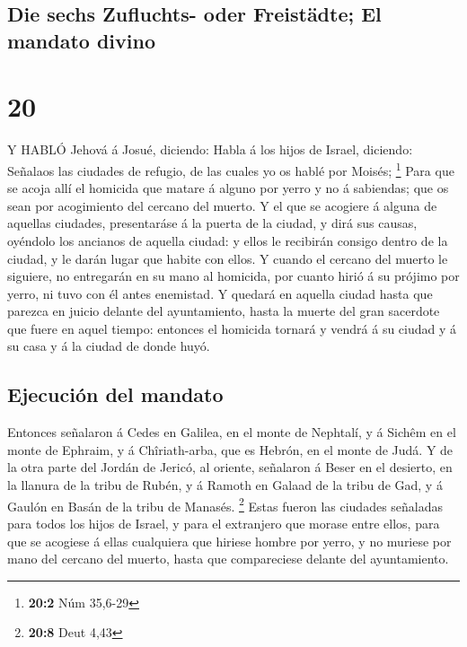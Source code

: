 \hypertarget{die-sechs-zufluchts--oder-freistuxe4dte-el-mandato-divino}{%
\subsection{Die sechs Zufluchts- oder Freistädte; El mandato
divino}\label{die-sechs-zufluchts--oder-freistuxe4dte-el-mandato-divino}}

\hypertarget{section-19}{%
\section{20}\label{section-19}}

 Y HABLÓ Jehová á Josué, diciendo:  Habla á los
hijos de Israel, diciendo: Señalaos las ciudades de refugio, de las
cuales yo os hablé por Moisés; \footnote{\textbf{20:2} Núm 35,6-29}
 Para que se acoja allí el homicida que matare á alguno por
yerro y no á sabiendas; que os sean por acogimiento del cercano del
muerto.  Y el que se acogiere á alguna de aquellas ciudades,
presentaráse á la puerta de la ciudad, y dirá sus causas, oyéndolo los
ancianos de aquella ciudad: y ellos le recibirán consigo dentro de la
ciudad, y le darán lugar que habite con ellos.  Y cuando el
cercano del muerto le siguiere, no entregarán en su mano al homicida,
por cuanto hirió á su prójimo por yerro, ni tuvo con él antes enemistad.
 Y quedará en aquella ciudad hasta que parezca en juicio
delante del ayuntamiento, hasta la muerte del gran sacerdote que fuere
en aquel tiempo: entonces el homicida tornará y vendrá á su ciudad y á
su casa y á la ciudad de donde huyó.

\hypertarget{ejecuciuxf3n-del-mandato}{%
\subsection{Ejecución del mandato}\label{ejecuciuxf3n-del-mandato}}

 Entonces señalaron á Cedes en Galilea, en el monte de
Nephtalí, y á Sichêm en el monte de Ephraim, y á Chîriath-arba, que es
Hebrón, en el monte de Judá.  Y de la otra parte del Jordán
de Jericó, al oriente, señalaron á Beser en el desierto, en la llanura
de la tribu de Rubén, y á Ramoth en Galaad de la tribu de Gad, y á
Gaulón en Basán de la tribu de Manasés. \footnote{\textbf{20:8} Deut
  4,43}  Estas fueron las ciudades señaladas para todos los
hijos de Israel, y para el extranjero que morase entre ellos, para que
se acogiese á ellas cualquiera que hiriese hombre por yerro, y no
muriese por mano del cercano del muerto, hasta que compareciese delante
del ayuntamiento.

